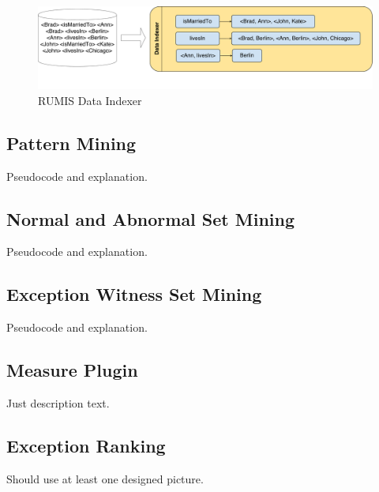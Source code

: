 \begin{figure}[ht]
\centering
\includegraphics[width=1.0\textwidth]{figures/data_indexing}
\caption{RUMIS Data Indexer}
\label{system_overview}
\end{figure}

\subsection{Pattern Mining}

Pseudocode and explanation.

\subsection{Normal and Abnormal Set Mining}

Pseudocode and explanation.

\subsection{Exception Witness Set Mining}

Pseudocode and explanation.

\subsection{Measure Plugin}

Just description text.

\subsection{Exception Ranking}

Should use at least one designed picture.

